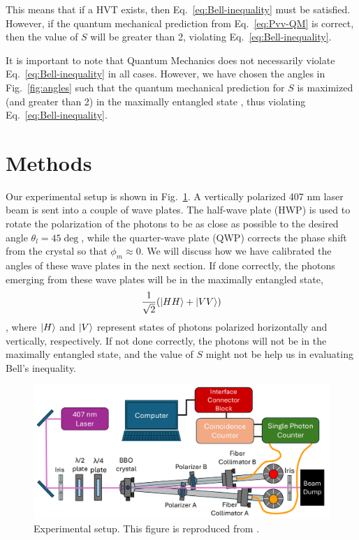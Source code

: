 \documentclass{../paper}
\newcommand{\eq}[1]{Eq.~\eqref{#1}}
\newcommand{\fig}[1]{Fig.~\ref{#1}}
\begin{document}
This means that if a HVT exists, then \eq{eq:Bell-inequality} must be satisfied. However, if the quantum mechanical prediction from \eq{eq:Pvv-QM} is correct, then the value of $S$ will be greater than 2, violating \eq{eq:Bell-inequality}.

It is important to note that Quantum Mechanics does not necessarily violate \eq{eq:Bell-inequality} in all cases. However, we have chosen the angles in \fig{fig:angles} such that the quantum mechanical prediction for $S$ is maximized (and greater than 2) in the maximally entangled state \cite{Dehlinger2002}, thus violating \eq{eq:Bell-inequality}.

\section{Methods}\label{sec:methods}

Our experimental setup is shown in \fig{fig:setup}. A vertically polarized 407 nm laser beam is sent into a couple of wave plates. The half-wave plate (HWP) is used to rotate the polarization of the photons to be as close as possible to the desired angle $\theta_l = 45\deg$, while the quarter-wave plate (QWP) corrects the phase shift from the crystal so that $\phi_m \approx 0$. We will discuss how we have calibrated the angles of these wave plates in the next section. If done correctly, the photons emerging from these wave plates will be in the maximally entangled state,
\begin{equation}\label{eq:entangled-state}
  \frac{1}{\sqrt{2}} (\ket{HH} + \ket{VV})
\end{equation}
\cite{LabManual}, where $\ket{H}$ and $\ket{V}$ represent states of photons polarized horizontally and vertically, respectively. If not done correctly, the photons will not be in the maximally entangled state, and the value of $S$ might not be help us in evaluating Bell's inequality.

\begin{figure}
  \centering
  \includegraphics[width=1.0\columnwidth]{assets/setup.png}
  \caption{Experimental setup. This figure is reproduced from \cite{LabManual}.}
  \label{fig:setup}
\end{figure}
\end{document}
